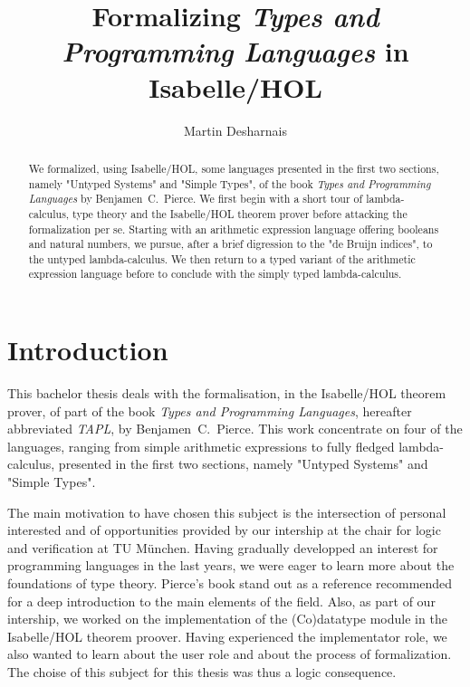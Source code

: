 \documentclass[a4paper, oneside, 12pt, titlepage]{article}
\begin{document}
\title{Formalizing \emph{Types and Programming Languages} in Isabelle/HOL}
\author{Martin Desharnais}
\maketitle

\begin{abstract}
We formalized, using Isabelle/HOL, some languages presented in the first two sections, namely
"Untyped Systems" and "Simple Types", of the book \emph{Types and Programming Languages} by
Benjamen~C.~Pierce. We first begin with a short tour of lambda-calculus, type theory and the
Isabelle/HOL theorem prover before attacking the formalization per se. Starting with an arithmetic
expression language offering booleans and natural numbers, we pursue, after a brief digression to
the "de Bruijn indices", to the untyped lambda-calculus. We then return to a typed variant of the
arithmetic expression language before to conclude with the simply typed lambda-calculus.
\end{abstract}

\tableofcontents
\newpage

\section{Introduction}

This bachelor thesis deals with the formalisation, in the Isabelle/HOL theorem prover, of part of
the book \emph{Types and Programming Languages}, hereafter abbreviated \emph{TAPL}, by
Benjamen~C.~Pierce. This work concentrate on four of the languages, ranging from simple arithmetic
expressions to fully fledged lambda-calculus, presented in the first two sections, namely "Untyped
Systems" and "Simple Types".

The main motivation to have chosen this subject is the intersection of personal interested and of
opportunities provided by our intership at the chair for logic and verification at TU München.
Having gradually developped an interest for programming languages in the last years, we were eager
to learn more about the foundations of type theory. Pierce's book stand out as a reference
recommended for a deep introduction to the main elements of the field. Also, as part of our
intership, we worked on the implementation of the (Co)datatype module in the Isabelle/HOL theorem
proover. Having experienced the implementator role, we also wanted to learn about the user role and
about the process of formalization. The choise of this subject for this thesis was thus a logic
consequence.
\end{document}
